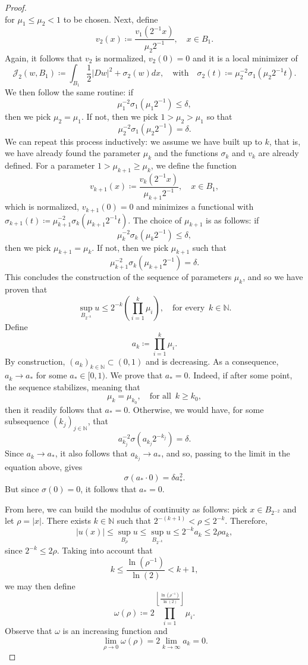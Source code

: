 \documentclass[10pt,a4paper]{amsart}
\begin{document}
\begin{proof}
$$$$
for $\mu_1 \leq \mu_2 < 1$ to be chosen. Next, define
$$
    v_2(x) \coloneqq \frac{v_1\left(2^{-1}x\right)}{\mu_2 2^{-1}}, \quad x \in B_1.
$$
Again, it follows that $v_2$ is normalized, $v_2(0) = 0$ and it is a local minimizer of
$$
    \mathcal{J}_2(w,B_1) \coloneqq \int_{B_1} \frac12 |Dw|^2 + \sigma_2(w)dx, \quad \text{with} \quad \sigma_2(t) \coloneqq \mu_2^{-2}\sigma_1\left(\mu_2 2^{-1} t\right).
$$
We then follow the same routine: if
$$
    \mu_1^{-2}\sigma_1\left(\mu_1 2^{-1} \right) \leq \delta,
$$
then we pick $\mu_2 = \mu_1$. If not, then we pick $1 > \mu_2 > \mu_1$ so that
$$
   \mu_2^{-2}\sigma_1\left(\mu_2 2^{-1}\right) = \delta. 
$$
We can repeat this process inductively: we assume we have built up to $k$, that is, we have already found the parameter $\mu_k$ and the functions $\sigma_k$ and $v_k$ are already defined. For a parameter $1 > \mu_{k+1} \geq \mu_k$, we define the function
$$
    v_{k+1}(x) \coloneqq \frac{v_{k}(2^{-1}x)}{\mu_{k+1}2^{-1}}, \quad x \in B_1,
$$
which is normalized, $v_{k+1}(0) = 0$ and minimizes a functional with $\sigma_{k+1}(t) \coloneqq \mu_{k+1}^{-2}\sigma_k(\mu_{k+1}2^{-1}t)$. The choice of $\mu_{k+1}$ is as follows: if
$$
    \mu_{k}^{-2}\sigma_k(\mu_{k}2^{-1}) \leq \delta,
$$
then we pick $\mu_{k+1} = \mu_k$. If not, then we pick $\mu_{k+1}$ such that
$$
    \mu_{k+1}^{-2}\sigma_k\left(\mu_{k+1} 2^{-1}\right) = \delta.
$$
This concludes the construction of the sequence of parameters $\mu_k$, and so we have proven that
$$
    \sup_{B_{2^{-k}}}u \leq 2^{-k}\left(\prod_{i=1}^{k}\mu_i\right), \quad \text{for every }\, k \in \mathbb{N}.
$$
Define
$$
    a_k \coloneqq \prod_{i=1}^{k}\mu_i.
$$
By construction, $(a_k)_{k \in \mathbb{N}} \subset (0,1)$ and is decreasing. As a consequence, $a_k \to a_{\ast}$ for some $a_{\ast} \in [0,1)$. We prove that $a_{\ast} = 0$. Indeed, if after some point, the sequence stabilizes, meaning that
$$
    \mu_k = \mu_{k_0}, \quad \text{for all }\, k \geq k_0,
$$
then it readily follows that $a_{\ast} = 0$. Otherwise, we would have, for some subsequence $(k_j)_{j \in \mathbb{N}}$, that
$$
    a_{k_j}^{-2}\sigma(a_{k_j}2^{-k_j}) = \delta.
$$
Since $a_k \to a_{\ast}$, it also follows that $a_{k_j} \to a_{\ast}$, and so, passing to the limit in the equation above, gives
$$
    \sigma(a_{\ast} \cdot 0) = \delta a_{\ast}^2.
$$
But since $\sigma(0) = 0$, it follows that $a_{\ast} = 0$. 

From here, we can build the modulus of continuity as follows: pick $x \in B_{2^{-2}}$ and let $\rho = |x|$. There exists $k \in \mathbb{N}$ such that $2^{-(k+1)} < \rho \leq 2^{-k}$. Therefore, 
$$
    |u(x)| \leq \sup_{B_{\rho}} u \leq \sup_{B_{2^{-k}}}u \leq 2^{-k} a_k \leq 2\rho a_k,
$$
since $2^{-k} \leq 2\rho$. Taking into account that
$$
    k \leq \frac{\ln\left(\rho^{-1}\right)}{\ln(2)} < k+1,
$$
we may then define
$$
     \omega(\rho) \coloneqq 2 \prod_{i=1}^{\left\lfloor{\frac{\ln(\rho^{-1})}{\ln(2)}}\right\rfloor} \mu_i.
$$
Observe that $\omega$ is an increasing function and 
$$
    \lim_{\rho \to 0} \omega(\rho) = 2 \lim_{k \to \infty} a_k = 0.
$$
\end{proof}
\end{document}
